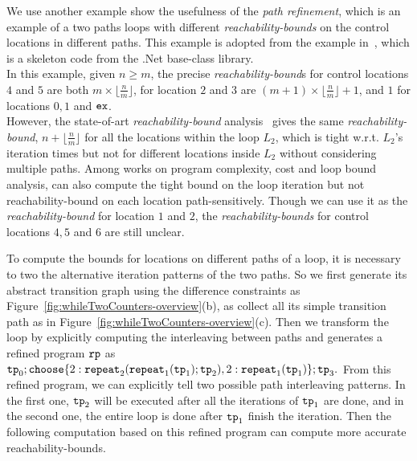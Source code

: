 \begin{example}
  \label{ex:threeNestedWhile}
  
  We use another example show the usefulness of the \emph{path refinement}, which is an example of a two paths loops
  with different \emph{reachability-bounds} on the control locations in different paths.
  This example is adopted from the example in~\cite{GulwaniZ10}, which
  is a skeleton code from the .Net base-class library.
  \\
  In this example, given $n \geq m$,
the precise \emph{reachability-bound}s for control locations $4$ and $5$ are both $m \times \lfloor\frac{n}{m}\rfloor$,
for location $2$ and $3$ are $(m + 1) \times \lfloor\frac{n}{m}\rfloor + 1$, 
and $1$ for locations $0, 1$ and $\mathtt{ex}$. 
\\
However, the state-of-art \emph{reachability-bound} analysis~\cite{GulwaniZ10}
gives the same \emph{reachability-bound}, $n + \lfloor\frac{n}{m}\rfloor$ for all the locations within the loop $L_2$, which is tight w.r.t. $L_2$'s iteration times but not for different locations inside $L_2$ without considering multiple paths.
Among works on program complexity, cost and loop bound analysis, \cite{GulwaniJK09} can also compute the tight bound on the loop iteration but not reachability-bound on each location path-sensitively.
Though we can use it as the \emph{reachability-bound} for location $1$ and $2$,
the \emph{reachability-bounds} for control locations $4, 5$ and $6$ are still unclear.

To compute the bounds for locations on different paths of a loop, it is necessary to two the alternative iteration patterns of the two paths.
So we first
generate its abstract transition graph using the difference constraints as Figure~\ref{fig:whileTwoCounters-overview}(b), as collect all its simple transition path as in Figure~\ref{fig:whileTwoCounters-overview}(c).
Then we transform the loop by explicitly computing the interleaving between paths and
generates a refined program $\mathtt{rp}$ as
\\
% 
  $
  \tpath_0 ; 
  \rpchoose{2: \rprepeat_2(\rprepeat_1(\tpath_1); \tpath_2), 
  2: \rprepeat_1(\tpath_1)}; \tpath_3.
  $
From this refined program, we can explicitly tell two possible path interleaving patterns.
In the first one, $\mathtt{tp}_2$ will be executed after all the iterations of $\mathtt{tp}_1$ are done, and in the second one,
the entire loop is done after $\mathtt{tp}_1$ finish the iteration.
Then the following computation based on this refined program can compute more accurate reachability-bounds.
\end{example}

